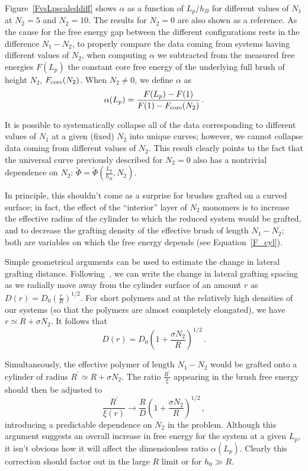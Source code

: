 Figure~\ref{FvsLpscaleddiff} shows $\alpha$ as a function of $L_p/h_B$ for different values of $N_1$ at 
$N_2=5$ and $N_2=10$. The results for $N_2=0$ are also shown as a reference.
As the cause for the free energy gap between the different configurations 
rests in the difference  $N_1-N_2$, to properly compare the data coming from systems having 
different values of $N_2$, when computing $\alpha$
we subtracted from the measured free energies $F(L_p)$ the constant 
core free energy of the underlying full brush of height $N_2$, $F_{\rm core}(N_2)$.
When $N_2\neq0$, we define $\alpha$ as  
\begin{equation}
	\alpha(L_p) = \frac{F(L_p)-F(1)}{F(1)-F_{\rm core}(N_2)} \,.
\end{equation}

It is possible to systematically collapse all of the data corresponding to 
different values of $N_1$ at a given (fixed) $N_2$ into unique curves;
however, we cannot collapse data coming from different values of $N_2$. 
This result clearly points to the fact that the universal curve previously described for $N_2=0$ also has a nontrivial dependence on $N_2$: $\tilde \Phi=\tilde \Phi \left(\frac{L_p}{h_B},N_2\right)$. 

In principle, this shouldn't come as a  surprise for brushes grafted on a curved surface;
in fact, the effect of the ``interior'' layer of $N_2$ monomers is to increase the effective radius of the cylinder to which the reduced system would be grafted, and to decrease the grafting density of the effective brush of length $N_1-N_2$; both are variables on which the free energy depends (see Equation~\ref{F_cyl}).

Simple geometrical arguments can be used to estimate the change in lateral grafting distance.
Following~\cite{LipowskyPB}, we can write the change in lateral grafting  spacing
as we radially move away from the cylinder surface of an amount $r$ as $D(r)=D_0 \left(\frac{r}{R}\right)^{1/2}$. 
For short polymers and 
at the relatively high densities of our systems (so that the polymers are almost completely elongated), we have $r\simeq R+\sigma N_2$. 
It follows that
\begin{equation}
D(r)=D_0 \left(1+\frac{\sigma N_2}{R}\right)^{1/2} \,.
\end{equation}

Simultaneously, the effective polymer of length $N_1-N_2$ 
would be grafted onto a cylinder of radius $R^\prime\simeq R+\sigma N_2$. The ratio $\frac{R^\prime}{\xi}$
appearing in the brush free energy should then be adjusted to
\begin{equation}
 \frac{R^\prime}{\xi(r)} \rightarrow \frac{R}{D} \left(1+\frac{\sigma N_2}{R}\right)^{1/2} \,,
\end{equation}
introducing a predictable dependence on $N_2$
 in the problem. Although this argument suggests an overall increase in free energy for the system at a given $L_p$, 
 it isn't obvious how it will affect the dimensionless ratio $\alpha (L_p)$. Clearly this correction should factor out in the large $R$ limit or for $h_0 \gg R$.
 

